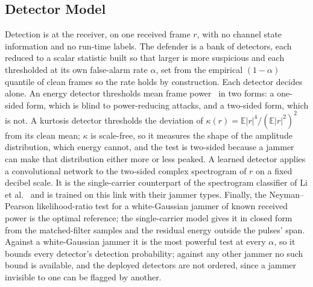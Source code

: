 \subsection{Detector Model}
\label{sec:detector}
Detection is at the receiver, on one received frame $r$, with no channel state information and no run-time labels.
The defender is a bank of detectors, each reduced to a scalar statistic built so that larger is more suspicious and each thresholded at its own false-alarm rate $\alpha$, set from the empirical $(1{-}\alpha)$ quantile of clean frames so the rate holds by construction.
Each detector decides alone.
An energy detector thresholds mean frame power~\cite{urkowitz1967energy} in two forms: a one-sided form, which is blind to power-reducing attacks, and a two-sided form, which is not.
A kurtosis detector thresholds the deviation of $\kappa(r)=\mathbb{E}|r|^4/(\mathbb{E}|r|^2)^2$ from its clean mean; $\kappa$ is scale-free, so it measures the shape of the amplitude distribution, which energy cannot, and the test is two-sided because a jammer can make that distribution either more or less peaked.
A learned detector applies a convolutional network to the two-sided complex spectrogram of $r$ on a fixed decibel scale.
It is the single-carrier counterpart of the spectrogram classifier of Li et al.~\cite{li2022jamming_ofdm} and is trained on this link with their jammer types.
Finally, the Neyman--Pearson likelihood-ratio test for a white-Gaussian jammer of known received power is the optimal reference; the single-carrier model gives it in closed form from the matched-filter samples and the residual energy outside the pulses' span.
Against a white-Gaussian jammer it is the most powerful test at every $\alpha$, so it bounds every detector's detection probability; against any other jammer no such bound is available, and the deployed detectors are not ordered, since a jammer invisible to one can be flagged by another.

